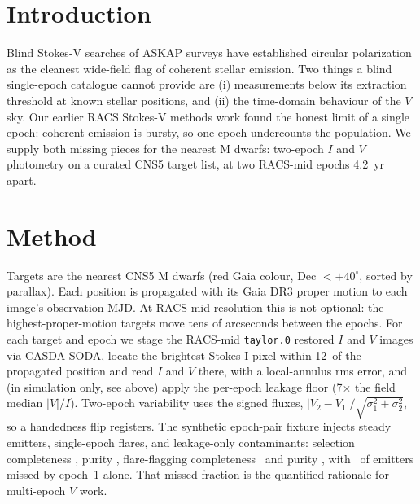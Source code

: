 \documentclass[twocolumn]{aastex631}
\newcommand{\code}[1]{\texttt{#1}}
\begin{document}

\section{Introduction}
Blind Stokes-V searches of ASKAP surveys \citep{pritchard2021,driessen2024,racs8_2026} have
established circular polarization as the cleanest wide-field flag of coherent stellar emission.
Two things a blind single-epoch catalogue cannot provide are (i) measurements below its
extraction threshold at known stellar positions, and (ii) the time-domain behaviour of the $V$
sky. Our earlier RACS Stokes-V methods work found the honest limit of a single epoch: coherent
emission is bursty, so one epoch undercounts the population. We supply both missing
pieces for the nearest M dwarfs: two-epoch $I$ and $V$ photometry on a curated CNS5 target
list, at two RACS-mid
epochs 4.2~yr apart.

\section{Method}
Targets are the nearest CNS5 M dwarfs (red Gaia colour, Dec $<+40^\circ$, sorted by parallax).
Each position is propagated with its Gaia DR3 proper motion to each image's observation MJD.
At RACS-mid resolution this is not optional: the highest-proper-motion targets move tens of
arcseconds between the epochs. For each target and epoch we stage the RACS-mid \code{taylor.0}
restored $I$ and $V$ images via CASDA SODA, locate the brightest Stokes-I pixel within
12\arcsec\ of the propagated position and read $I$ and $V$ there, with a local-annulus rms
error, and (in simulation only, see above) apply the per-epoch leakage floor (7$\times$ the field median
$|V|/I$). Two-epoch variability uses the signed fluxes, $|V_2-V_1|/\sqrt{\sigma_1^2+\sigma_2^2}$,
so a handedness flip registers. The synthetic epoch-pair fixture injects steady emitters,
single-epoch flares, and leakage-only contaminants: selection completeness \svdComp, purity
\svdPur, flare-flagging completeness \svdVarComp\ and purity \svdVarPur, with \svdMissFrac\ of
emitters missed by epoch~1 alone. That missed fraction is the quantified rationale for
multi-epoch $V$ work.
\end{document}
